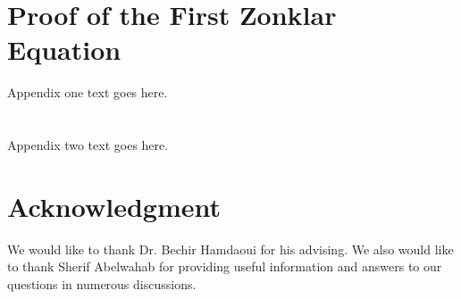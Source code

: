 \documentclass[journal]{IEEEtran}
\begin{document}
%


\appendices
\section{Proof of the First Zonklar Equation}
Appendix one text goes here.

\section{}
Appendix two text goes here.


\section*{Acknowledgment}
We would like to thank Dr. Bechir Hamdaoui for his advising. We also would like to thank Sherif Abelwahab for providing useful information and answers to our questions in numerous discussions.



\ifCLASSOPTIONcaptionsoff
  \newpage
\fi




\end{document}
